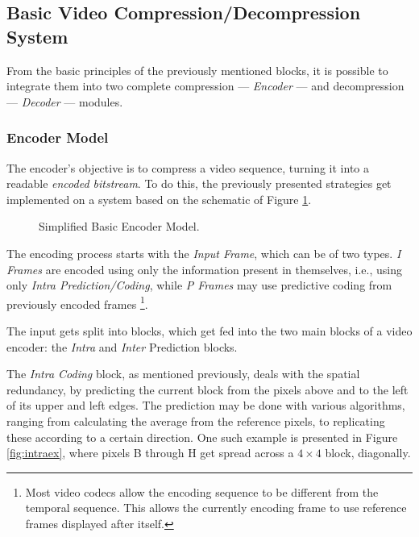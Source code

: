 \subsection{Basic Video Compression/Decompression System}

From the basic principles of the previously mentioned blocks, it is possible to integrate them into two complete compression --- \emph{Encoder} --- and decompression --- \emph{Decoder} --- modules.

\subsubsection{Encoder Model} \label{ssse:encmod}

The encoder's objective is to compress a video sequence, turning it into a readable \emph{encoded bitstream}. To do this, the previously presented strategies get implemented on a system based on the schematic of Figure \ref{fig:basicenc}.

\begin{figure}[!htbp]
    \centering
    
    \caption{Simplified Basic Encoder Model.}
    \label{fig:basicenc}
\end{figure}

The encoding process starts with the \emph{Input Frame}, which can be of two types. \emph{I Frames} are encoded using only the information present in themselves, i.e., using only \emph{Intra Prediction/Coding}, while \emph{P Frames} may use predictive coding from previously encoded frames \footnote{Most video codecs allow the encoding sequence to be different from the temporal sequence. This allows the currently encoding frame to use reference frames displayed after itself.}.

The input gets split into blocks, which get fed into the two main blocks of a video encoder: the \emph{Intra} and \emph{Inter} Prediction blocks.

The \emph{Intra Coding} block, as mentioned previously, deals with the spatial redundancy, by predicting the current block from the pixels above and to the left of its upper and left edges. The prediction may be done with various algorithms, ranging from calculating the average from the reference pixels, to replicating these according to a certain direction. One such example is presented in Figure \ref{fig:intraex}, where pixels B through H get spread across a $4\times 4$ block, diagonally.

